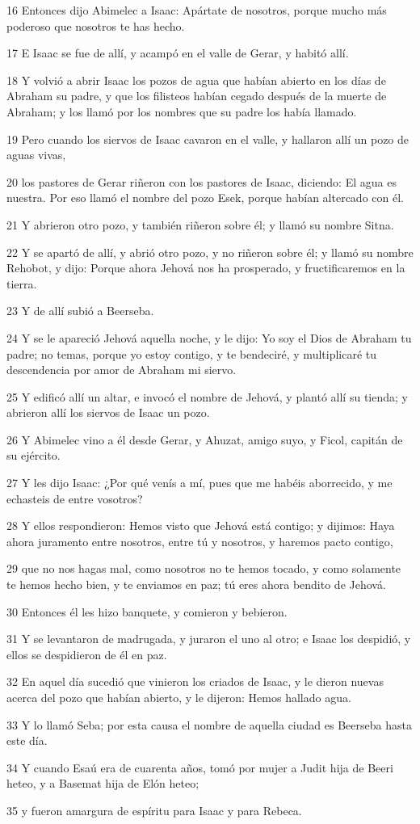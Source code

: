\par 16 Entonces dijo Abimelec a Isaac: Apártate de nosotros, porque mucho más poderoso que nosotros te has hecho.
\par 17 E Isaac se fue de allí, y acampó en el valle de Gerar, y habitó allí.
\par 18 Y volvió a abrir Isaac los pozos de agua que habían abierto en los días de Abraham su padre, y que los filisteos habían cegado después de la muerte de Abraham; y los llamó por los nombres que su padre los había llamado.
\par 19 Pero cuando los siervos de Isaac cavaron en el valle, y hallaron allí un pozo de aguas vivas,
\par 20 los pastores de Gerar riñeron con los pastores de Isaac, diciendo: El agua es nuestra. Por eso llamó el nombre del pozo Esek, porque habían altercado con él.
\par 21 Y abrieron otro pozo, y también riñeron sobre él; y llamó su nombre Sitna.
\par 22 Y se apartó de allí, y abrió otro pozo, y no riñeron sobre él; y llamó su nombre Rehobot, y dijo: Porque ahora Jehová nos ha prosperado, y fructificaremos en la tierra.
\par 23 Y de allí subió a Beerseba.
\par 24 Y se le apareció Jehová aquella noche, y le dijo: Yo soy el Dios de Abraham tu padre; no temas, porque yo estoy contigo, y te bendeciré, y multiplicaré tu descendencia por amor de Abraham mi siervo.
\par 25 Y edificó allí un altar, e invocó el nombre de Jehová, y plantó allí su tienda; y abrieron allí los siervos de Isaac un pozo.
\par 26 Y Abimelec vino a él desde Gerar, y Ahuzat, amigo suyo, y Ficol, capitán de su ejército.
\par 27 Y les dijo Isaac: ¿Por qué venís a mí, pues que me habéis aborrecido, y me echasteis de entre vosotros?
\par 28 Y ellos respondieron: Hemos visto que Jehová está contigo; y dijimos: Haya ahora juramento entre nosotros, entre tú y nosotros, y haremos pacto contigo,
\par 29 que no nos hagas mal, como nosotros no te hemos tocado, y como solamente te hemos hecho bien, y te enviamos en paz; tú eres ahora bendito de Jehová.
\par 30 Entonces él les hizo banquete, y comieron y bebieron.
\par 31 Y se levantaron de madrugada, y juraron el uno al otro; e Isaac los despidió, y ellos se despidieron de él en paz.
\par 32 En aquel día sucedió que vinieron los criados de Isaac, y le dieron nuevas acerca del pozo que habían abierto, y le dijeron: Hemos hallado agua.
\par 33 Y lo llamó Seba; por esta causa el nombre de aquella ciudad es Beerseba hasta este día.
\par 34 Y cuando Esaú era de cuarenta años, tomó por mujer a Judit hija de Beeri heteo, y a Basemat hija de Elón heteo;
\par 35 y fueron amargura de espíritu para Isaac y para Rebeca.

